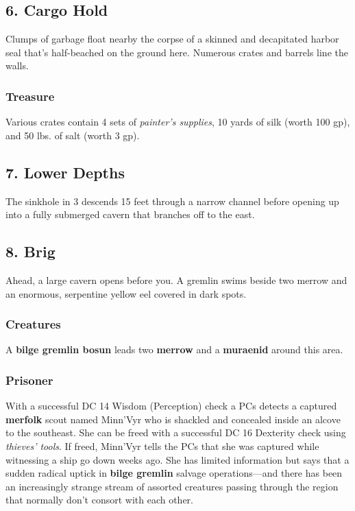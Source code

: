 \documentclass[10pt,a4paper,twoside,bg=print,twocolumn,openany,nodeprecatedcode]{dndbook}
\begin{document}
\subsection{6. Cargo Hold}
\begin{DndReadAloud}{}
Clumps of garbage float nearby the corpse of a skinned and decapitated harbor seal that's half-beached on the ground here. Numerous crates and barrels line the walls.

\end{DndReadAloud}

\subsubsection{Treasure}
Various crates contain 4 sets of \textit{painter's supplies}, 10 yards of silk (worth 100 gp), and 50 lbs. of salt (worth 3 gp).

\subsection{7. Lower Depths}
The sinkhole in 3 descends 15 feet through a narrow channel before opening up into a fully submerged cavern that branches off to the east.

\subsection{8. Brig}
\begin{DndReadAloud}{}
Ahead, a large cavern opens before you. A gremlin swims beside two merrow and an enormous, serpentine yellow eel covered in dark spots.

\end{DndReadAloud}

\subsubsection{Creatures}
A \textbf{bilge gremlin bosun} leads two \textbf{merrow} and a \textbf{muraenid} around this area.

\subsubsection{Prisoner}
With a successful DC 14 Wisdom (Perception) check a PCs detects a captured \textbf{merfolk} scout named Minn'Vyr who is shackled and concealed inside an alcove to the southeast. She can be freed with a successful DC 16 Dexterity check using \textit{thieves' tools}. If freed, Minn'Vyr tells the PCs that she was captured while witnessing a ship go down weeks ago. She has limited information but says that a sudden radical uptick in \textbf{bilge gremlin} salvage operations—and there has been an increasingly strange stream of assorted creatures passing through the region that normally don't consort with each other.
\end{document}

